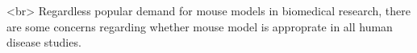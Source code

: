 <br> Regardless popular demand for mouse models in biomedical research, there are some concerns regarding whether mouse model is approprate in all human disease studies. 